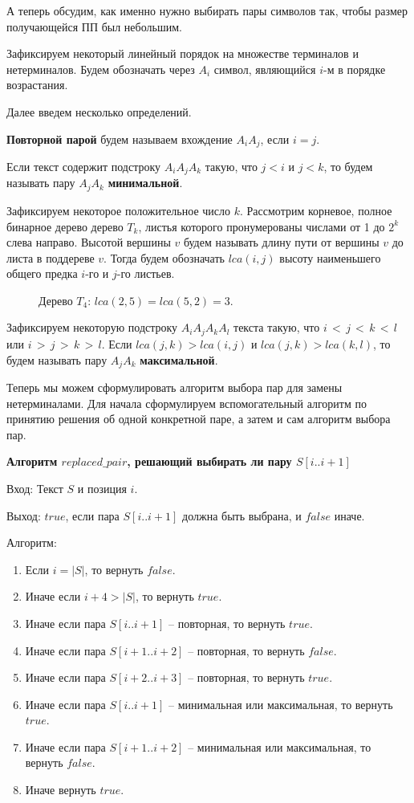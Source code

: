\documentclass[14pt]{article}
\begin{document}
А теперь обсудим, как именно нужно выбирать пары символов так, чтобы размер получающейся ПП был небольшим.

Зафиксируем некоторый линейный порядок на множестве терминалов и нетерминалов. 
Будем обозначать через $A_i$ символ, являющийся $i$-м в порядке возрастания.

Далее введем несколько определений.

{\bf Повторной парой} будем называем вхождение $A_iA_j$, если $i = j$.

Если текст содержит подстроку $A_iA_jA_k$ такую, что $j < i$ и $j < k$, то будем называть пару $A_jA_k$ {\bf минимальной}.

Зафиксируем некоторое положительное число $k$. Рассмотрим корневое, полное бинарное дерево дерево $T_k$, листья которого
пронумерованы числами от 1 до $2^k$ слева направо. Высотой вершины $v$ будем называть длину пути от вершины $v$ до листа
в поддереве $v$. Тогда будем обозначать $lca(i, j)$ высоту наименьшего общего предка $i$-го и $j$-го листьев.

\begin{figure}[t]
	\picLCAExample{}
	\caption{Дерево $T_4$: $lca(2,5) = lca(5,2) = 3$.}
	\label{LCAExample}
\end{figure}

Зафиксируем некоторую подстроку $A_iA_jA_kA_l$ текста такую, что $i\,<\,j\,<\,k\,<\,l$ или $i\,>\,j\,>\,k\,>\,l$. Если
$lca(j, k) > lca(i, j)$ и $lca(j, k) > lca(k, l)$, то будем называть пару $A_jA_k$ {\bf максимальной}.

Теперь мы можем сформулировать алгоритм выбора пар для замены нетерминалами.
Для начала сформулируем вспомогательный алгоритм по принятию решения об одной конкретной паре,
а затем и сам алгоритм выбора пар.

{\bf Алгоритм $replaced\_pair$, решающий выбирать ли пару $S[i..i+1]$}

{\sc Вход:} Текст $S$ и позиция $i$.

{\sc Выход:} $true$, если пара $S[i..i+1]$ должна быть выбрана, и $false$ иначе.

{\sc Алгоритм:}

\begin{enumerate}
	\item Если $i = |S|$, то вернуть $false$.
	\item Иначе если $i + 4 > |S|$, то вернуть $true$.
	\item Иначе если пара $S[i..i+1]$ -- повторная, то вернуть $true$.
	\item Иначе если пара $S[i+1..i+2]$ -- повторная, то вернуть $false$.
	\item Иначе если пара $S[i+2..i+3]$ -- повторная, то вернуть $true$.
	\item Иначе если пара $S[i..i+1]$ -- минимальная или максимальная, то вернуть $true$.
	\item Иначе если пара $S[i+1..i+2]$ -- минимальная или максимальная, то вернуть $false$.
	\item Иначе вернуть $true$.
\end{enumerate}
\end{document}
